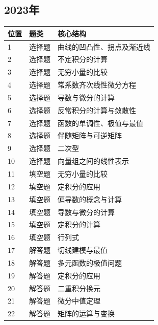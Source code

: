 \subsection*{2023年}
\begin{longtable}{p{9mm}p{25mm}p{109mm}}\toprule 位置&题类&核心结构\\\midrule\endhead
1&选择题&曲线的凹凸性、拐点及渐近线\\
2&选择题&不定积分的计算\\
3&选择题&无穷小量的比较\\
4&选择题&常系数齐次线性微分方程\\
5&选择题&导数与微分的计算\\
6&选择题&反常积分的计算与敛散性\\
7&选择题&函数的单调性、极值与最值\\
8&选择题&伴随矩阵与可逆矩阵\\
9&选择题&二次型\\
10&选择题&向量组之间的线性表示\\
11&填空题&无穷小量的比较\\
12&填空题&定积分的应用\\
13&填空题&偏导数的概念与计算\\
14&填空题&导数与微分的计算\\
15&填空题&定积分的计算\\
16&填空题&行列式\\
17&解答题&切线建模与最值\\
18&解答题&多元函数的极值问题\\
19&解答题&定积分的应用\\
20&解答题&二重积分换元\\
21&解答题&微分中值定理\\
22&解答题&矩阵的运算与变换\\
\bottomrule\end{longtable}
